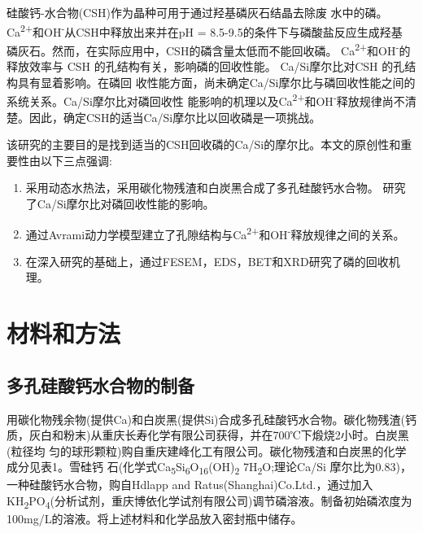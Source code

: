 \documentclass[11pt]{article}
\begin{document}
硅酸钙-水合物(CSH)作为晶种可用于通过羟基磷灰石结晶去除废
水中的磷。\cite{battistoni01_phosp_remov_from_real_anaer} Ca\textsuperscript{2+}和OH\textsuperscript{-}从CSH中释放出来并在pH = 8.5-9.5的条件下与磷酸盐反应生成羟基
磷灰石。然而，在实际应用中，CSH的磷含量太低而不能回收磷。
\cite{renman10_long_term_phosp_remov_by,de-bashan04_recen_advan_remov_phosp_from}  Ca\textsuperscript{2+}和OH\textsuperscript{-}的释放效率与
CSH \cite{yin11_phosp_remov_from_wastew_by} 的孔结构有关，影响磷的回收性能。
\cite{westholm06_subst_phosp_remov_poten_benef,baur04_dissol_precip_behav_ettrin_monos}
Ca/Si摩尔比对CSH
\cite{chen04_solub_struc_calcium_silic_hydrat,soyer-uzun11_compos_evolut_calcium_silic_hydrat,richardson04_tober_tober_hydrox_based_model}
的孔结构具有显着影响。在磷回
收性能方面，尚未确定Ca/Si摩尔比与磷回收性能之间的系统关系。Ca/Si摩尔比对磷回收性
能影响的机理以及Ca\textsuperscript{2+}和OH\textsuperscript{-}释放规律尚不清楚。因此，确定CSH的适当Ca/Si摩尔比以回收磷是一项挑战。

该研究的主要目的是找到适当的CSH回收磷的Ca/Si的摩尔比。本文的原创性和重要性由以下三点强调:
\begin{enumerate}
\item 采用动态水热法，采用碳化物残渣和白炭黑合成了多孔硅酸钙水合物。 \cite{li04_format_micro_porous_spher_partic,mansur10_prepar_charac_cytoc_bioac_coatin} 研究了Ca/Si摩尔比对磷回收性能的影响。
\item 通过Avrami动力学模型建立了孔隙结构与Ca\textsuperscript{2+}和OH\textsuperscript{-}释放规律之间的关系。
\item 在深入研究的基础上，通过FESEM，EDS，BET和XRD研究了磷的回收机理。
\end{enumerate}

\section{材料和方法}
\label{sec:org30b7f8a}
\subsection{多孔硅酸钙水合物的制备}
\label{sec:orgf118cac}
用碳化物残余物(提供Ca)和白炭黑(提供Si)合成多孔硅酸钙水合物。碳化物残渣(钙
质，灰白和粉末)从重庆长寿化学有限公司获得，并在700℃下煅烧2小时。白炭黑(粒径均
匀的球形颗粒)购自重庆建峰化工有限公司。碳化物残渣和白炭黑的化学成分见表1。雪硅钙
石(化学式Ca\textsubscript{5}Si\textsubscript{6}O\textsubscript{16}(OH)\textsubscript{2} \dot 7H\textsubscript{2}O;理论Ca/Si 摩尔比为0.83)，一种硅酸钙水合物，购自Hdlapp and Ratus(Shanghai)Co.Ltd.，通过加入KH\textsubscript{2}PO\textsubscript{4}(分析试剂，重庆博依化学试剂有限公司)调节磷溶液。制备初始磷浓度为100mg/L的溶液。将上述材料和化学品放入密封瓶中储存。
\end{document}
